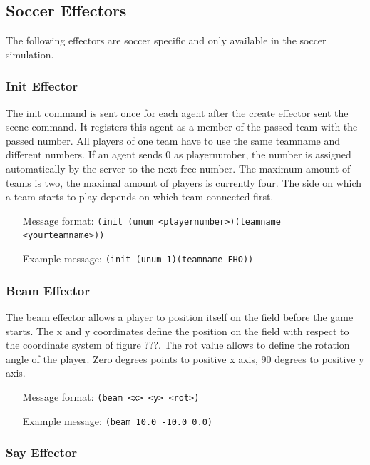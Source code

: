\subsection{Soccer Effectors}
\label{sec:soccereffectors}

The following effectors are soccer specific and only available in the soccer
simulation.

\subsubsection{Init Effector}
\label{sec:initeffector}

The init command is sent once for each agent after the create effector sent the
scene command. It registers this agent as a member of the passed team with the passed number.
All players of one team have to use the same teamname and different numbers.
If an agent sends 0 as playernumber, the number is assigned automatically by
the server to the next free number. The maximum amount of teams is two, the
maximal amount of players is currently four.
The side on which a team starts to play depends on which team connected
first.
\begin{itemize}
	\item[Message format:] \texttt{(init (unum <playernumber>)(teamname
	<yourteamname>))}
	\item[Example message:] \texttt{(init (unum 1)(teamname FHO))}
\end{itemize}

\subsubsection{Beam Effector}
\label{sec:beameffector}

The beam effector allows a player to position itself on the field before the
game starts. The x and y coordinates define the position on the field with
respect to the coordinate system of figure ???. The rot value allows to define
the rotation angle of the player. Zero degrees points to positive x axis, 90
degrees to positive y axis.
\begin{itemize}
	\item[Message format:] \texttt{(beam <x> <y> <rot>)}
	\item[Example message:] \texttt{(beam 10.0 -10.0 0.0)}
\end{itemize}

\subsubsection{Say Effector}
\label{sec:sayeffector}

